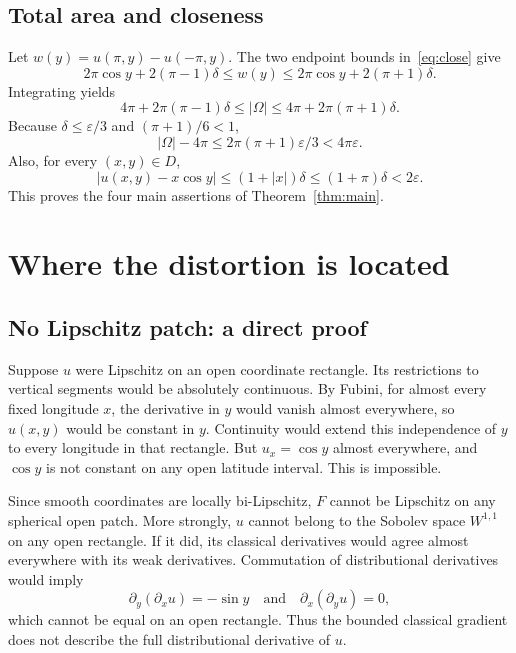 \documentclass[11pt,letterpaper]{article}
\numberwithin{equation}{section}
\theoremstyle{remark}
\newcommand{\eps}{\varepsilon}
\begin{document}
\subsection{Total area and closeness}

Let $w(y)=u(\pi,y)-u(-\pi,y)$. The two endpoint bounds in~\eqref{eq:close} give
\begin{equation}\label{eq:width}
 2\pi\cos y+2(\pi-1)\delta
 \le w(y)\le
 2\pi\cos y+2(\pi+1)\delta.
\end{equation}
Integrating yields
\begin{equation}\label{eq:areabounds}
 \boxed{\quad
 4\pi+2\pi(\pi-1)\delta
 \le|\Omega|\le
 4\pi+2\pi(\pi+1)\delta.
 \quad}
\end{equation}
Because $\delta\le\eps/3$ and $(\pi+1)/6<1$,
\[
 |\Omega|-4\pi\le2\pi(\pi+1)\eps/3<4\pi\eps.
\]
Also, for every $(x,y)\in D$,
\[
 |u(x,y)-x\cos y|\le(1+|x|)\delta
 \le(1+\pi)\delta<2\eps.
\]
This proves the four main assertions of Theorem~\ref{thm:main}.

\section{Where the distortion is located}
\label{sec:regularity}

\subsection{No Lipschitz patch: a direct proof}

Suppose $u$ were Lipschitz on an open coordinate rectangle. Its restrictions to vertical segments would be absolutely continuous. By Fubini, for almost every fixed longitude $x$, the derivative in $y$ would vanish almost everywhere, so $u(x,y)$ would be constant in $y$. Continuity would extend this independence of $y$ to every longitude in that rectangle. But $u_x=\cos y$ almost everywhere, and $\cos y$ is not constant on any open latitude interval. This is impossible.

Since smooth coordinates are locally bi-Lipschitz, $F$ cannot be Lipschitz on any spherical open patch. More strongly, $u$ cannot belong to the Sobolev space $W^{1,1}$ on any open rectangle. If it did, its classical derivatives would agree almost everywhere with its weak derivatives. Commutation of distributional derivatives would imply
\[
 \partial_y(\partial_xu)=-\sin y
 \quad\text{and}\quad
 \partial_x(\partial_yu)=0,
\]
which cannot be equal on an open rectangle. Thus the bounded classical gradient does not describe the full distributional derivative of $u$.
\end{document}
